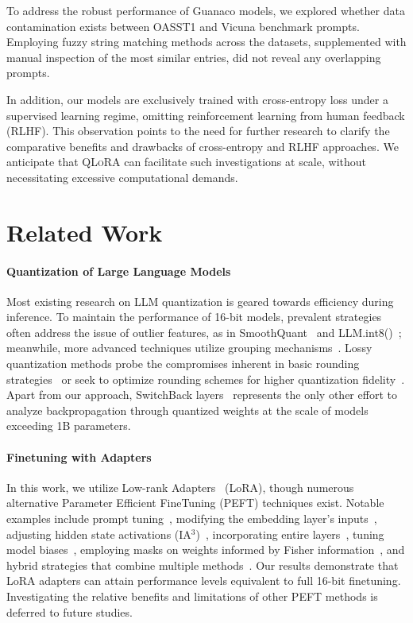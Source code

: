 To address the robust performance of {Guanaco} models, we explored whether data contamination exists between OASST1 and Vicuna benchmark prompts. Employing fuzzy string matching methods across the datasets, supplemented with manual inspection of the most similar entries, did not reveal any overlapping prompts.

In addition, our models are exclusively trained with cross-entropy loss under a supervised learning regime, omitting reinforcement learning from human feedback (RLHF). This observation points to the need for further research to clarify the comparative benefits and drawbacks of cross-entropy and RLHF approaches. We anticipate that \textsc{QLoRA} can facilitate such investigations at scale, without necessitating excessive computational demands.

\section{Related Work}

\paragraph{Quantization of Large Language Models} Most existing research on LLM quantization is geared towards efficiency during inference. To maintain the performance of 16-bit models, prevalent strategies often address the issue of outlier features, as in SmoothQuant~\citep{xiao2022smoothquant} and LLM.int8()~\citep{dettmers2022llm}; meanwhile, more advanced techniques utilize grouping mechanisms~\citep{park2022nuqmm, yao2022zeroquant}. Lossy quantization methods probe the compromises inherent in basic rounding strategies~\citep{dettmers2022case,zeng2022glm,pope2022efficiently} or seek to optimize rounding schemes for higher quantization fidelity~\citep{frantar2022gptq}. Apart from our approach, SwitchBack layers~\citep{wortsman2023stable} represents the only other effort to analyze backpropagation through quantized weights at the scale of models exceeding 1B parameters.

\paragraph{Finetuning with Adapters} In this work, we utilize Low-rank Adapters~\citep{hu2021lora} (LoRA), though numerous alternative Parameter Efficient FineTuning (PEFT) techniques exist. Notable examples include prompt tuning~\citep{qin2021learning,lester2021power,li2021prefix}, modifying the embedding layer's inputs~\citep{an2022input}, adjusting hidden state activations (IA$^3$)~\citep{liu2022few}, incorporating entire layers~\citep{houlsby2019parameter}, tuning model biases~\citep{zaken2021bitfit}, employing masks on weights informed by Fisher information~\citep{sung2021training}, and hybrid strategies that combine multiple methods~\citep{henderson2021compacter}. Our results demonstrate that LoRA adapters can attain performance levels equivalent to full 16-bit finetuning. Investigating the relative benefits and limitations of other PEFT methods is deferred to future studies.

